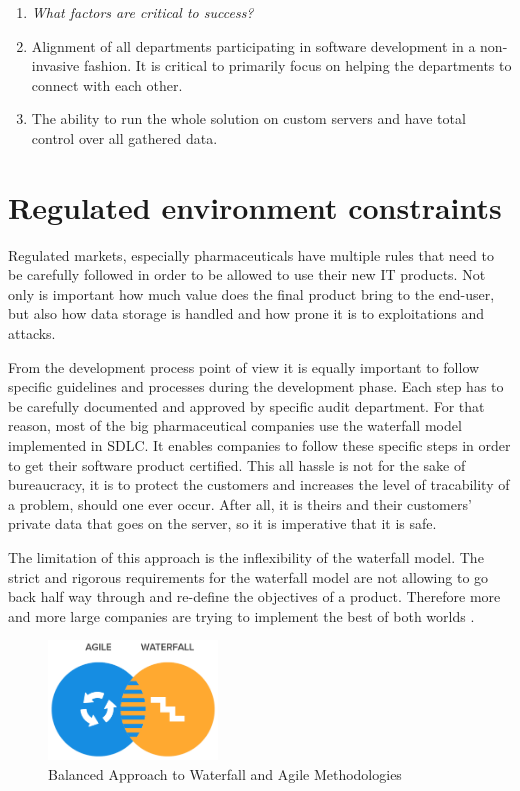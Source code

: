 \begin{enumerate}
	\item \emph{What factors are critical to success?	}
	\item[] Alignment of all departments participating in software development in a non-invasive fashion. It is critical to primarily focus on helping the departments to connect with each other.
	\item[] The ability to run the whole solution on custom servers and have total control over all gathered data.
	
\end{enumerate}


\section{Regulated environment constraints}

Regulated markets, especially pharmaceuticals have multiple rules that need to be carefully followed in order to be allowed to use their new IT products. Not only is important how much value does the final product bring to the end-user, but also how data storage is handled and how prone it is to exploitations and attacks. 

From the development process point of view it is equally important to follow specific guidelines and processes during the development phase. Each step has to be carefully documented and approved by specific audit department. For that reason, most of the big pharmaceutical companies use the waterfall model implemented in SDLC. It enables companies to follow these specific steps in order to get their software product certified. This all hassle is not for the sake of bureaucracy, it is to protect the customers and increases the level of tracability of a problem, should one ever occur. After all, it is theirs and their customers' private data that goes on the server, so it is imperative that it is safe.

The limitation of this approach is the inflexibility of the waterfall model. The strict and rigorous requirements for the waterfall model are not allowing to go back half way through and re-define the objectives of a product. Therefore more and more large companies are trying to implement the best of both worlds \cite{agile-waterfall}.

\begin{figure}[!ht]
	\centering
	\includegraphics[width=0.4\textwidth]{figures/02_analysis/agile-waterfall}
    \caption{Balanced Approach to Waterfall and Agile Methodologies}
\end{figure}

